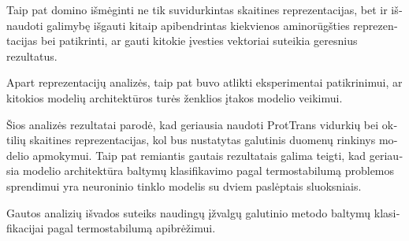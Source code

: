\documentclass[12pt]{article}
\begin{document}
\begin{otherlanguage}{lithuanian}
    Taip pat domino išmėginti ne tik suvidurkintas skaitines 
    reprezentacijas, bet ir išnaudoti galimybę išgauti kitaip
    apibendrintas kiekvienos aminorūgšties reprezentacijas bei 
    patikrinti, ar gauti kitokie įvesties vektoriai suteikia
    geresnius rezultatus. 
  
    Apart reprezentacijų analizės, taip pat buvo atlikti 
	eksperimentai
    patikrinimui, ar kitokios modelių architektūros turės
    ženklios įtakos modelio veikimui.

	Šios analizės rezultatai parodė, kad geriausia naudoti ProtTrans
	vidurkių bei oktilių skaitines reprezentacijas, kol bus nustatytas 
	galutinis duomenų rinkinys modelio apmokymui. Taip pat remiantis
	gautais rezultatais galima teigti, kad geriausia modelio 
	architektūra baltymų klasifikavimo pagal termostabilumą problemos
	sprendimui yra neuroninio tinklo modelis su dviem paslėptais
	sluoksniais.
      
    Gautos analizių išvados suteiks naudingų įžvalgų galutinio
    metodo baltymų klasifikacijai pagal termostabilumą apibrėžimui.

	\end{otherlanguage}

	\newpage
	
	\nocite{*}
	
	\normalsize

 

\end{document}
